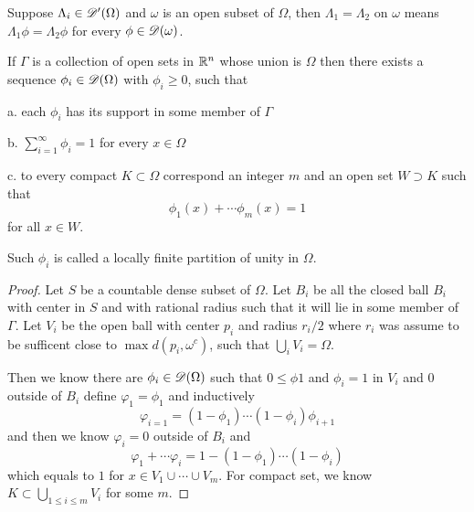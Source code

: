 \begin{definition}
    Suppose $\Lambda_i\in \mathscr{D}'(\Omega)$ and $\omega$ is an open subset of $\Omega$, then $\Lambda_1 = \Lambda_2$ on $\omega$ means $\Lambda_1 \phi = \Lambda_2 \phi$ for every $\phi \in \mathscr{D}(\omega)$.
\end{definition}

\begin{theorem}
    If $\Gamma$ is a collection of open sets in $\mathbb{R}^n$ whose union is $\Omega$ then there exists a sequence $\phi_i \in \mathscr{D}(\Omega)$ with $\phi_i \geq 0$, such that\par
    a. each $\phi_i$ has its support in some member of $\Gamma$\par
    b. $\sum\limits_{i=1}^{\infty} \phi_i = 1$ for every $x\in \Omega$\par
    c. to every compact $K\subset\Omega$ correspond an integer $m$ and an open set $W\supset K$ such that
    \[\phi_1(x) + \cdots \phi_m(x) = 1\]
    for all $x\in W$.\par
    Such $\phi_i$ is called a locally finite partition of unity in $\Omega$.
\end{theorem}
\begin{proof}
    Let $S$ be a countable dense subset of $\Omega$. Let $B_i$ be all the closed ball $B_i$ with center in $S$ and with rational radius such that it will lie in some member of $\Gamma$. Let $V_i$ be the open ball with center $p_i$ and radius $r_i/2$ where $r_i$ was assume to be sufficent close to $\max d(p_i, \omega^c)$, such that $\bigcup_{i} V_i = \Omega$.\par
    Then we know there are $\phi_i \in \mathscr{D}(\Omega)$ such that $0\leq \phi 1$ and $\phi_i = 1$ in $V_i$ and $0$ outside of $B_i$ define $\varphi_1 = \phi_1$ and inductively
    \[
    \varphi_{i=1} = (1-\phi_1)\cdots(1-\phi_i)\phi_{i+1}
    \]
    and then we know $\varphi_i = 0$ outside of $B_i$ and
    \[
    \varphi_1 + \cdots \varphi_i = 1 - (1-\phi_1)\cdots(1-\phi_i)
    \] 
    which equals to $1$ for $ x \in V_1\cup \cdots \cup V_m$. For compact set, we know $K\subset \bigcup_{1\leq i \leq m}V_i$ for some $m$.
\end{proof}

